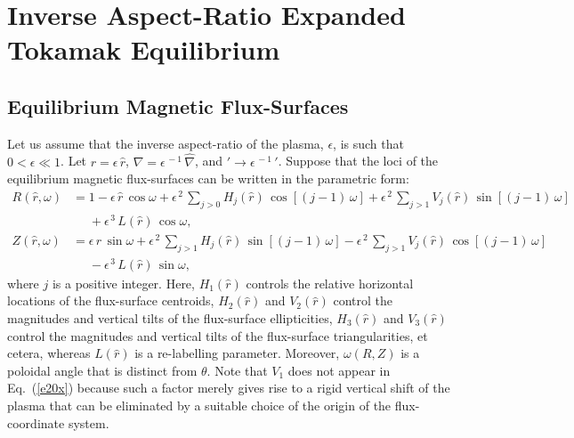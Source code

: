 \documentclass[12pt,prb,aps]{revtex4-1}
\begin{document}
\section{Inverse Aspect-Ratio Expanded Tokamak Equilibrium}\label{large}
\subsection{Equilibrium Magnetic Flux-Surfaces}
Let us assume that the inverse aspect-ratio of the plasma, $\epsilon$, is such that $0<\epsilon\ll 1$.  
Let $r=\epsilon\,\hat{r}$, $\nabla =\epsilon^{\,-1}\,\hat{\nabla}$, and $'\rightarrow \epsilon^{\,-1}\,'$. 
Suppose that the loci of the equilibrium magnetic flux-surfaces can be written in the parametric form:\,\cite{con0,gim,am1,fitz2024}
\begin{align}
R(\hat{r},\omega) &= 1 -\epsilon\,\hat{r}\,\cos\omega + \epsilon^{\,2}\,\sum_{j>0}H_j(\hat{r})\,\cos[(j-1)\,\omega] + \epsilon^{\,2}\,\sum_{j>1}V_j(\hat{r})\,\sin[(j-1)\,\omega] \nonumber\\[0.5ex]
&\phantom{=}+\epsilon^{\,3}\,L(\hat{r})\,\cos\omega,\label{e19x}\\[0.5ex]
Z(\hat{r},\omega)&= \epsilon\,\hat{r}\,\sin\omega +\epsilon^{\,2}\,\sum_{j>1}H_j(\hat{r})\,\sin[(j-1)\,\omega]
-\epsilon^{\,2}\,\sum_{j>1}V_j(\hat{r})\,\cos[(j-1)\,\omega]\nonumber\\[0.5ex]&\phantom{=}-\epsilon^{\,3}\,L(\hat{r})\,\sin\omega,\label{e20x}
\end{align}
where $j$ is a positive integer. 
Here, $H_1(\hat{r})$  controls the relative horizontal locations of the flux-surface centroids, $H_2(\hat{r})$ and $V_2(\hat{r})$ control the 
magnitudes and vertical tilts of the flux-surface ellipticities, $H_3(\hat{r})$ and
$V_3(\hat{r})$ control the magnitudes and vertical tilts of the flux-surface triangularities, et cetera, whereas $L(\hat{r})$ is a
re-labelling parameter. Moreover, $\omega(R,Z)$ is a  poloidal angle that is distinct from $\theta$. Note that $V_1$ does not appear in Eq.~(\ref{e20x})
because such a factor merely gives rise to a rigid vertical shift of the plasma that can be eliminated by a suitable choice of the
origin of the flux-coordinate system.\cite{fitz2024}
\end{document}
